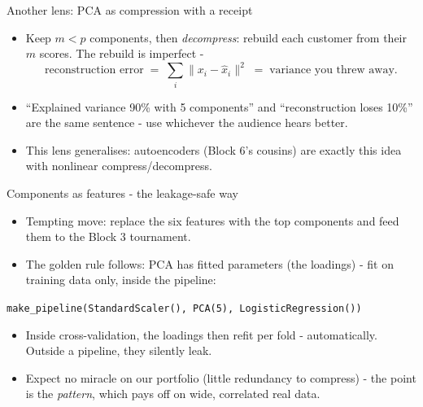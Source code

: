 \documentclass[10pt,aspectratio=169]{beamer}
\begin{document}
\begin{frame}{Another lens: PCA as compression with a receipt}
  \begin{itemize}
    \item Keep $m < p$ components, then \emph{decompress}: rebuild each
          customer from their $m$ scores. The rebuild is imperfect -
          \[
            \text{reconstruction error} \;=\;
            \textstyle\sum_i \lVert x_i - \hat{x}_i \rVert^2
            \;=\; \text{variance you threw away.}
          \]
    \item ``Explained variance 90\% with 5 components'' and
          ``reconstruction loses 10\%'' are the \alert{same sentence} -
          use whichever the audience hears better.
    \item This lens generalises: autoencoders (Block 6's cousins) are
          exactly this idea with nonlinear compress/decompress.
  \end{itemize}
\end{frame}

\begin{frame}{Components as features - the leakage-safe way}
  \begin{itemize}
    \item Tempting move: replace the six features with the top components and
          feed them to the Block 3 tournament.
    \item The golden rule follows: PCA has fitted parameters (the loadings)
          - \alert{fit on training data only}, inside the pipeline:
  \end{itemize}
  \vspace{0.3em}
  \begin{center}\small
    \texttt{make\_pipeline(StandardScaler(), PCA(5), LogisticRegression())}
  \end{center}
  \vspace{0.3em}
  \begin{itemize}
    \item Inside cross-validation, the loadings then refit per fold -
          automatically. Outside a pipeline, they silently leak.
    \item Expect no miracle on our portfolio (little redundancy to
          compress) - the point is the \emph{pattern}, which pays off on
          wide, correlated real data.
  \end{itemize}
\end{frame}
\end{document}
